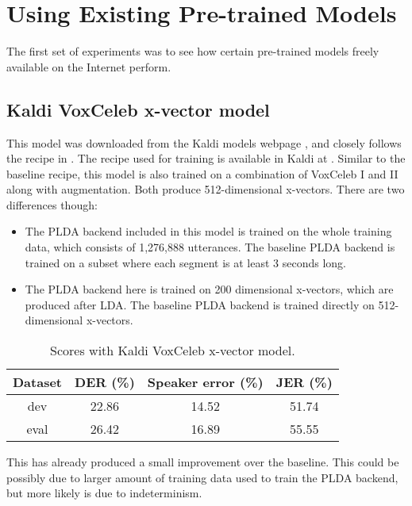 	\section{Using Existing Pre-trained Models}
	The first set of experiments was to see how certain pre-trained models freely available on the Internet perform.
	
		\subsection{Kaldi VoxCeleb x-vector model}
			This model was downloaded from the Kaldi models webpage \cite{kaldi_models_webpage}, and closely follows the recipe in \cite{snyder2018x}. The recipe used for training is available in Kaldi at . Similar to the baseline recipe, this model is also trained on a combination of VoxCeleb I and II along with augmentation. Both produce 512-dimensional x-vectors. There are two differences though:
			\begin{itemize}
				\item The PLDA backend included in this model is trained on the whole training data, which consists of 1,276,888 utterances. The baseline PLDA backend is trained on a subset where each segment is at least 3 seconds long.
				\item The PLDA backend here is trained on 200 dimensional x-vectors, which are produced after LDA. The baseline PLDA backend is trained directly on 512-dimensional x-vectors.
			\end{itemize}
	
			\begin{table}[h]
			\centering
			\begin{tabular}{|c|c|c|c|}
				\hline
				Dataset & DER (\%) & Speaker error (\%) & JER (\%) \\
				\hline
				dev & 22.86 & 14.52 & 51.74 \\
				\hline
				eval & 26.42 & 16.89 & 55.55 \\
				\hline
			\end{tabular}
			\caption{Scores with Kaldi VoxCeleb x-vector model.}
			\end{table}
		
			This has already produced a small improvement over the baseline. This could be possibly due to larger amount of training data used to train the PLDA backend, but more likely is due to indeterminism.
		
